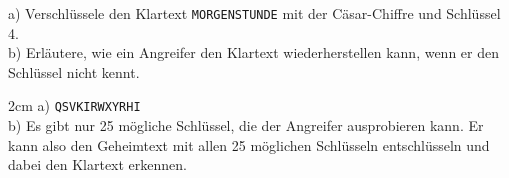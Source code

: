\question[3]
a) Verschlüssele den Klartext \texttt{MORGENSTUNDE} 
mit der Cäsar-Chiffre und Schlüssel 4. \\
b) Erläutere, wie ein Angreifer den Klartext wiederherstellen kann, 
wenn er den Schlüssel nicht kennt. \\

\begin{solutionbox}{2cm}
a) \texttt{QSVKIRWXYRHI}    \\
b) Es gibt nur 25 mögliche Schlüssel, die der Angreifer ausprobieren kann. Er kann also den Geheimtext mit allen 25 möglichen Schlüsseln entschlüsseln und
dabei den Klartext erkennen.
\end{solutionbox}

